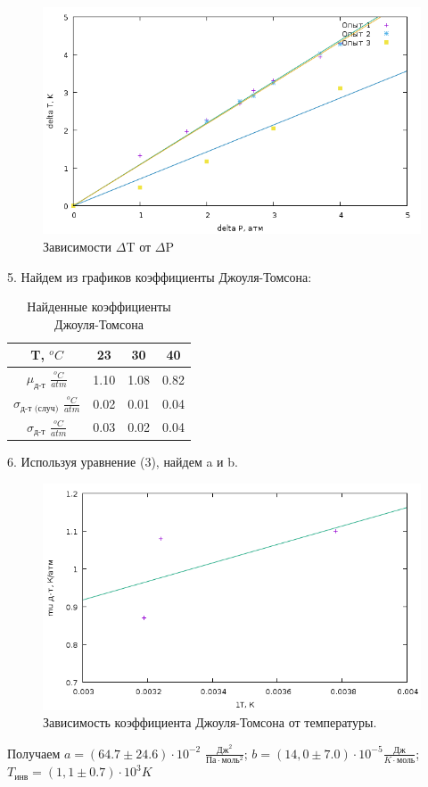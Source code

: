 \documentclass[a4paper]{article}
\begin{document}
	\begin{figure}[ht!]
		\centering
		\includegraphics[width=125mm]{plot.png}
		\caption{Зависимости $\Delta$T от $\Delta$P\label{overflow}}
	\end{figure}
	5. Найдем из графиков коэффициенты Джоуля-Томсона: 
	\begin{table}[h!]
 		\centering
	\begin{tabular}{|c|c|c|c|}
	\hline
	T, $^o C$ & 23 & 30 & 40 \\
	\hline
	$\mu_\text{д-т}$ $\frac{^o C}{atm}$& 1.10 & 1.08 & 0.82 \\
	\hline
	$\sigma_\text{д-т (случ)}$ $\frac{^o C}{atm}$& 0.02 & 0.01 & 0.04 \\
	\hline
	$\sigma_\text{д-т}$ $\frac{^o C}{atm}$& 0.03 & 0.02 & 0.04 \\
	\hline
	\end{tabular}
  		\caption{Найденные коэффициенты Джоуля-Томсона}
	\end{table}
	6. Используя уравнение (3), найдем a и b.
	\begin{figure}[ht!]
		\centering
		\includegraphics[width=125mm]{plot2.png}
		\caption{Зависимость коэффициента Джоуля-Томсона от температуры.\label{overflow}}
	\end{figure}
	Получаем $a=(64.7 \pm 24.6)\cdot 10^{-2}$ $\frac{\text{Дж}^2}{Па\cdot \text{моль}^2}$; $b=(14,0 \pm 7.0) \cdot 10^{-5} \frac{\text{Дж}}{K \cdot \text{моль}}$; $T_\text{инв}=(1,1 \pm 0.7) \cdot 10^3 K$
\end{document}
